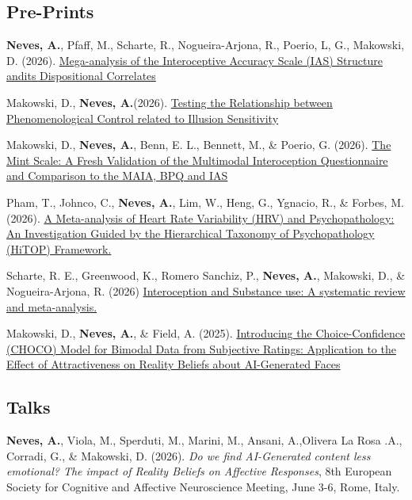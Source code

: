 \documentclass[11pt,a4paper,]{awesome-cv}
\begin{document}
\subsection{Pre-Prints}\label{pre-prints}

\small

\textbf{Neves, A.}, Pfaff, M., Scharte, R., Nogueira-Arjona, R., Poerio,
L, G., Makowski, D. (2026).
\href{https://osf.io/preprints/psyarxiv/2mpqd_v2}{Mega-analysis of the
Interoceptive Accuracy Scale (IAS) Structure andits Dispositional
Correlates}

Makowski, D., \textbf{Neves, A.}(2026).
\href{https://osf.io/preprints/psyarxiv/873th_v7}{Testing the
Relationship between Phenomenological Control related to Illusion
Sensitivity}

Makowski, D., \textbf{Neves, A.}, Benn, E. L., Bennett, M., \& Poerio,
G. (2026). \href{https://osf.io/preprints/psyarxiv/8qrht_v1}{The Mint
Scale: A Fresh Validation of the Multimodal Interoception Questionnaire
and Comparison to the MAIA, BPQ and IAS}

Pham, T., Johnco, C., \textbf{Neves, A.}, Lim, W., Heng, G., Ygnacio,
R., \& Forbes, M. (2026).
\href{https://osf.io/preprints/psyarxiv/zu8aq_v1}{A Meta-analysis of
Heart Rate Variability (HRV) and Psychopathology: An Investigation
Guided by the Hierarchical Taxonomy of Psychopathology (HiTOP)
Framework.} \normalsize

Scharte, R. E., Greenwood, K., Romero Sanchiz, P., \textbf{Neves, A.},
Makowski, D., \& Nogueira-Arjona, R. (2026)
\href{https://osf.io/preprints/psyarxiv/gzv78_v1}{Interoception and
Substance use: A systematic review and meta-analysis.}

Makowski, D., \textbf{Neves, A.}, \& Field, A. (2025).
\href{https://osf.io/preprints/psyarxiv/z68v3_v1}{Introducing the
Choice-Confidence (CHOCO) Model for Bimodal Data from Subjective
Ratings: Application to the Effect of Attractiveness on Reality Beliefs
about AI-Generated Faces}

\normalsize

\subsection{Talks}\label{talks}

\small

\textbf{Neves, A.}, Viola, M., Sperduti, M., Marini, M., Ansani,
A.,Olivera La Rosa .A., Corradi, G., \& Makowski, D. (2026). \emph{Do we
find AI-Generated content less emotional? The impact of Reality Beliefs
on Affective Responses}, 8th European Society for Cognitive and
Affective Neuroscience Meeting, June 3-6, Rome, Italy.
\end{document}
